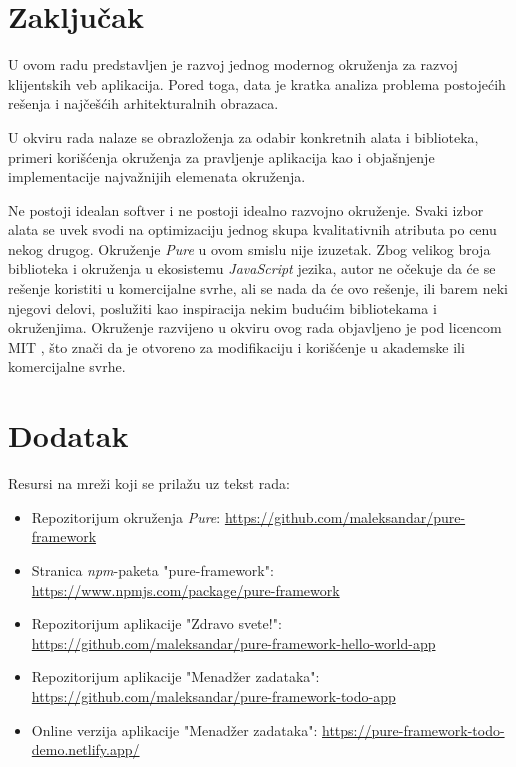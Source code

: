 \documentclass[12pt,oneside]{memoir}
\begin{document}

\chapter{Zaključak}\label{chap:zakljucak}

U ovom radu predstavljen je razvoj jednog modernog okruženja za razvoj klijentskih veb aplikacija. Pored toga, data je kratka analiza problema postojećih rešenja i najčešćih arhitekturalnih obrazaca.

U okviru rada nalaze se obrazloženja za odabir konkretnih alata i biblioteka, primeri korišćenja okruženja za pravljenje aplikacija kao i objašnjenje implementacije najvažnijih elemenata okruženja.

Ne postoji idealan softver i ne postoji idealno razvojno okruženje. Svaki izbor alata se uvek svodi na optimizaciju jednog skupa kvalitativnih atributa po cenu nekog drugog. Okruženje \emph{Pure} u ovom smislu nije izuzetak.
Zbog velikog broja biblioteka i okruženja u ekosistemu \emph{JavaScript} jezika, autor ne očekuje da će se rešenje koristiti u komercijalne svrhe,
ali se nada da će ovo rešenje, ili barem neki njegovi delovi, poslužiti kao inspiracija nekim budućim bibliotekama i okruženjima.
Okruženje razvijeno u okviru ovog rada objavljeno je pod licencom MIT \cite{MIT}, što znači da je otvoreno za modifikaciju i korišćenje u akademske ili komercijalne svrhe.


\chapter{Dodatak}
\label{chap:dodatak}
Resursi na mreži koji se prilažu uz tekst rada:
\begin{itemize}
  \item Repozitorijum okruženja \emph{Pure}: \url{https://github.com/maleksandar/pure-framework}
  \item Stranica \emph{npm}-paketa "pure-framework": \url{https://www.npmjs.com/package/pure-framework}
  \item Repozitorijum aplikacije "Zdravo svete!": \url{https://github.com/maleksandar/pure-framework-hello-world-app}
  \item Repozitorijum aplikacije "Menadžer zadataka": \url{https://github.com/maleksandar/pure-framework-todo-app}
  \item Online verzija aplikacije "Menadžer zadataka": \url{https://pure-framework-todo-demo.netlify.app/}
\end{itemize}
\literatura
\end{document}
